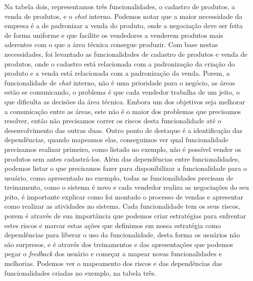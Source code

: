       Na tabela dois, representamos três funcionalidades, o cadastro de produtos,
      a venda de produtos, e o \textit{chat} interno. Podemos notar que a maior necessidade
      da empresa é a de padronizar a venda do produto, onde a negociação deve ser
      feita de forma uniforme e que facilite os vendedores a venderem produtos
      mais aderentes com o que a área técnica consegue produzir. Com base nestas
      necessidades, foi levantado as funcionalidades de cadastro de produtos e
      venda de produtos, onde o cadastro está relacionada com a padronização da
      criação do produto e a venda está relacionada com a padronização da venda.
      Porem, a funcionalidade de \textit{chat} interno, não é uma prioridade para
      o negócio, as áreas estão se comunicando, o problema é que cada vendedor
      trabalha de um jeito, o que dificulta as decisões da área técnica. Embora um
      dos objetivos seja melhorar a comunicação entre as áreas, este não é o maior
      dos problemas que precisamos resolver, então não precisamos correr os riscos
      desta funcionalidade até o desenvolvimento das outras duas. \newline
      Outro ponto de destaque é a identificação das dependências, quando mapeamos
      elas, conseguimos ver qual funcionalidade precisamos realizar primeiro, como
      listado no exemplo, não é possível vender os produtos sem antes cadastrá-los.
      Além das dependências entre funcionalidades, podemos listar o que precisamos
      fazer para disponibilizar a funcionalidade para o usuário, como apresentado
      no exemplo, todas as funcionalidades precisam de treinamento, como o sistema
      é novo e cada vendedor realiza as negociações do seu jeito, é importante
      explicar como foi montado o processo de vendas e apresentar como realizar
      as atividades no sistema. \newline
      Cada funcionalidade tem os seus riscos, porem é através de sua importância que
      podemos criar estratégias para enfrentar estes riscos e marcar estas ações
      que definimos em nossa estratégia como dependências para liberar o uso da
      funcionalidade, desta forma os usuários não são surpresos, e é através dos
      treinamentos e das apresentações que podemos pegar o \textit{feedback} dos
      usuário e começar a mapear novas funcionalidades e melhorias. Podemos ver
      o mapeamento dos riscos e das dependências das funcionalidades criadas no
      exemplo, na tabela três. \newline

